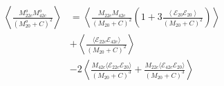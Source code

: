 \begin{equation}
\begin{split}
    \left\langle \frac{M^o_{22c}M^o_{42c}}{(M^o_{20}+C)^2}\right\rangle
    &= \left\langle \frac{M_{22c}M_{42c}}{(M_{20}+C)^2}
        \left(1+3\frac{\left\langle\mathcal{E}_{20}\mathcal{E}_{20}\right\rangle}
                    {(M_{20}+C)^2}
        \right)
        \right\rangle\\
    &+ \left\langle
        \frac{\langle\mathcal{E}_{22c}\mathcal{E}_{42c}\rangle}{(M_{20}+C)^2}
        \right\rangle\\
    &- 2\left\langle\frac{M_{42c}\langle\mathcal{E}_{22c}\mathcal{E}_{20}\rangle}
        {(M_{20}+C)^3}
        + \frac{M_{22c}\langle\mathcal{E}_{42c}\mathcal{E}_{20}\rangle}
        {(M_{20}+C)^3}\right\rangle\\
\end{split}
\end{equation}
